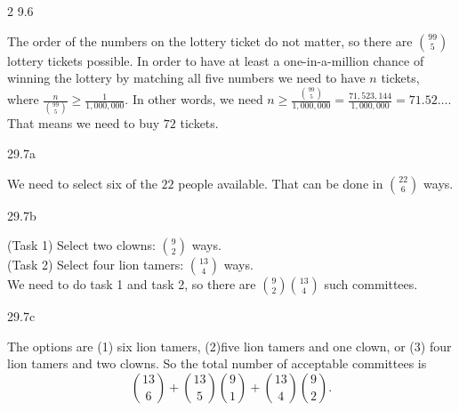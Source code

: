 \begin{Solution}{2 9.6}

The order of the numbers on the lottery ticket do not matter, so there are $\binom{99}{5}$ lottery tickets possible.
In order to have at least a one-in-a-million chance of winning the lottery by matching all five numbers we need to have $n$ tickets, where $\frac{n}{\binom{99}{5}} \geq \frac{1}{1,000,000}$. In other words, we need
$n\geq \frac{\binom{99}{5}}{1,000,000} = \frac{71,523,144}{1,000,000} = 71.52\ldots$. That means we need to buy $72$ tickets.



\end{Solution}

\begin{Solution}{29.7a}

We need to select six of the $22$ people available. That can be done in $\binom{22}{6}$ ways.


\end{Solution}

\begin{Solution}{29.7b}

(Task 1) Select two clowns: $\binom{9}{2}$ ways.\\
(Task 2) Select four lion tamers: $\binom{13}{4}$ ways.\\
We need to do task 1 and task 2, so there are $\binom{9}{2}\binom{13}{4}$ such committees.

\end{Solution}

\begin{Solution}{29.7c}

The options are (1) six lion tamers, (2)five lion tamers and one clown, or (3) four lion tamers and two clowns.
So the total number of acceptable committees is
\[
\binom{13}{6} +\binom{13}{5}\binom{9}{1}+\binom{13}{4}\binom{9}{2}.
\]

\end{Solution}